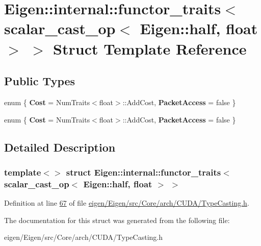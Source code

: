 \hypertarget{struct_eigen_1_1internal_1_1functor__traits_3_01scalar__cast__op_3_01_eigen_1_1half_00_01float_01_4_01_4}{}\section{Eigen\+:\+:internal\+:\+:functor\+\_\+traits$<$ scalar\+\_\+cast\+\_\+op$<$ Eigen\+:\+:half, float $>$ $>$ Struct Template Reference}
\label{struct_eigen_1_1internal_1_1functor__traits_3_01scalar__cast__op_3_01_eigen_1_1half_00_01float_01_4_01_4}
\subsection*{Public Types}
\begin{DoxyCompactItemize}
\item 
\mbox{\label{struct_eigen_1_1internal_1_1functor__traits_3_01scalar__cast__op_3_01_eigen_1_1half_00_01float_01_4_01_4_a8afb43cf52e9b71658aaaa1e69c13872}} 
enum \{ {\bfseries Cost} = Num\+Traits$<$float$>$\+:\+:Add\+Cost, 
{\bfseries Packet\+Access} = false
 \}
\item 
\mbox{\label{struct_eigen_1_1internal_1_1functor__traits_3_01scalar__cast__op_3_01_eigen_1_1half_00_01float_01_4_01_4_ad545d00ffc59733d43595e3d9dc932af}} 
enum \{ {\bfseries Cost} = Num\+Traits$<$float$>$\+:\+:Add\+Cost, 
{\bfseries Packet\+Access} = false
 \}
\end{DoxyCompactItemize}


\subsection{Detailed Description}
\subsubsection*{template$<$$>$\newline
struct Eigen\+::internal\+::functor\+\_\+traits$<$ scalar\+\_\+cast\+\_\+op$<$ Eigen\+::half, float $>$ $>$}



Definition at line \hyperlink{eigen_2_eigen_2src_2_core_2arch_2_c_u_d_a_2_type_casting_8h_source_l00067}{67} of file \hyperlink{eigen_2_eigen_2src_2_core_2arch_2_c_u_d_a_2_type_casting_8h_source}{eigen/\+Eigen/src/\+Core/arch/\+C\+U\+D\+A/\+Type\+Casting.\+h}.



The documentation for this struct was generated from the following file\+:\begin{DoxyCompactItemize}
\item 
eigen/\+Eigen/src/\+Core/arch/\+C\+U\+D\+A/\+Type\+Casting.\+h\end{DoxyCompactItemize}
